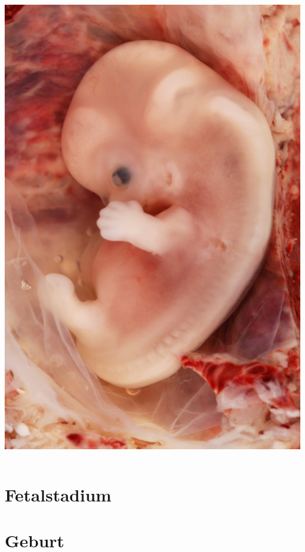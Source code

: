 \documentclass{beamer}
\begin{document}
\begin{frame}
\begin{columns}[c]
\begin{column}{5cm}
\includegraphics[width=\textwidth]{9-Week_Human_Embryo_from_Ectopic_Pregnancy.jpg}

\end{column}


\end{columns}
\end{frame}

  
\section{Fetalstadium}

\section{Geburt}
\end{document}
